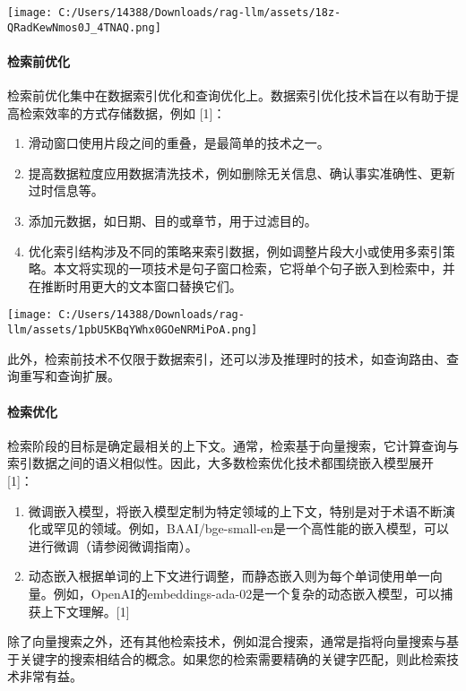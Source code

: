\documentclass[
]{article}
\begin{document}
\texttt{[image: C:/Users/14388/Downloads/rag-llm/assets/18z-QRadKewNmos0J\_4TNAQ.png]}

\paragraph{检索前优化}\label{ux68c0ux7d22ux524dux4f18ux5316}

检索前优化集中在数据索引优化和查询优化上。数据索引优化技术旨在以有助于提高检索效率的方式存储数据，例如
{[}1{]}：

\begin{enumerate}
\def\labelenumi{\arabic{enumi}.}
\item
  滑动窗口使用片段之间的重叠，是最简单的技术之一。
\item
  提高数据粒度应用数据清洗技术，例如删除无关信息、确认事实准确性、更新过时信息等。
\item
  添加元数据，如日期、目的或章节，用于过滤目的。
\item
  优化索引结构涉及不同的策略来索引数据，例如调整片段大小或使用多索引策略。本文将实现的一项技术是句子窗口检索，它将单个句子嵌入到检索中，并在推断时用更大的文本窗口替换它们。
\end{enumerate}

\texttt{[image: C:/Users/14388/Downloads/rag-llm/assets/1pbU5KBqYWhx0GOeNRMiPoA.png]}

此外，检索前技术不仅限于数据索引，还可以涉及推理时的技术，如查询路由、查询重写和查询扩展。

\paragraph{检索优化}\label{ux68c0ux7d22ux4f18ux5316}

检索阶段的目标是确定最相关的上下文。通常，检索基于向量搜索，它计算查询与索引数据之间的语义相似性。因此，大多数检索优化技术都围绕嵌入模型展开
{[}1{]}：

\begin{enumerate}
\def\labelenumi{\arabic{enumi}.}
\item
  微调嵌入模型，将嵌入模型定制为特定领域的上下文，特别是对于术语不断演化或罕见的领域。例如，BAAI/bge-small-en是一个高性能的嵌入模型，可以进行微调（请参阅微调指南）。
\item
  动态嵌入根据单词的上下文进行调整，而静态嵌入则为每个单词使用单一向量。例如，OpenAI的embeddings-ada-02是一个复杂的动态嵌入模型，可以捕获上下文理解。{[}1{]}
\end{enumerate}

除了向量搜索之外，还有其他检索技术，例如混合搜索，通常是指将向量搜索与基于关键字的搜索相结合的概念。如果您的检索需要精确的关键字匹配，则此检索技术非常有益。
\end{document}
